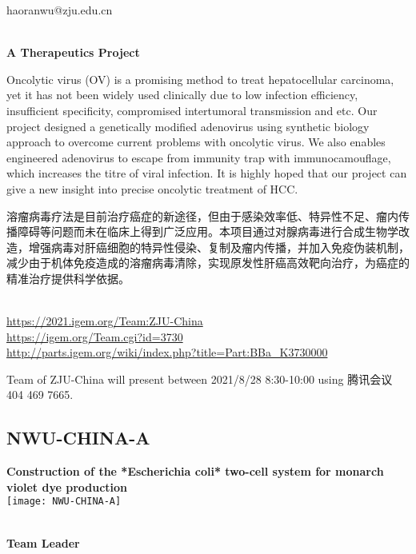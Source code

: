   haoranwu@zju.edu.cn


\textbf{\\A Therapeutics Project\\}\begin{spacing}{1.5}

Oncolytic virus (OV) is a promising method to treat hepatocellular carcinoma, yet it has not been widely used clinically due to low infection efficiency, insufficient specificity, compromised intertumoral transmission and etc. Our project designed a genetically modified adenovirus using synthetic biology approach to overcome current problems with oncolytic virus. We also enables engineered adenovirus to escape from immunity trap with immunocamouflage, which increases the titre of viral infection. It is highly hoped that our project can give a new insight into precise oncolytic treatment of HCC.

溶瘤病毒疗法是目前治疗癌症的新途径，但由于感染效率低、特异性不足、瘤内传播障碍等问题而未在临床上得到广泛应用。本项目通过对腺病毒进行合成生物学改造，增强病毒对肝癌细胞的特异性侵染、复制及瘤内传播，并加入免疫伪装机制，减少由于机体免疫造成的溶瘤病毒清除，实现原发性肝癌高效靶向治疗，为癌症的精准治疗提供科学依据。\end{spacing}
\\

\url{https://2021.igem.org/Team:ZJU-China }\\
\url{https://igem.org/Team.cgi?id=3730 }\\
\url{http://parts.igem.org/wiki/index.php?title=Part:BBa_K3730000 }\\


\vfill{}









Team of ZJU-China will present between    2021/8/28 8:30-10:00     using 腾讯会议 404 469 7665.
\newpage


\subsection{\textcolor{Blu}{ NWU-CHINA-A } }
\vspace{5mm}
\begin{center}
\large{
  \textbf{ Construction of the *Escherichia coli* two-cell system for monarch violet dye production }\\
  \texttt{[image: NWU-CHINA-A]}
}
\end{center}
\textbf{\\Team Leader}

